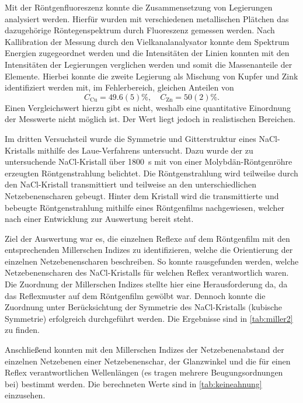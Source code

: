 Mit der Röntgenfluoreszenz konnte die Zusammensetzung von 
Legierungen analysiert werden. Hierfür wurden mit verschiedenen metallischen Plätchen 
das dazugehörige Röntegenspektrum durch Fluoreszenz gemessen werden. Nach Kallibration
der Messung durch den Vielkanalanalysator konnte dem Spektrum Energien zugegeordnet werden und die 
Intensitäten der Linien konnten mit den Intensitäten der Legierungen verglichen werden und somit
die Massenanteile der Elemente. Hierbei konnte die zweite Legierung als 
Mischung von Kupfer und Zink identifiziert werden mit, im Fehlerbereich, gleichen Anteilen von 
\begin{equation*}
    C_\mathrm{Cu} = 49.6(5)\%,\quad C_\mathrm{Zn} = 50(2)\%.
\end{equation*}
Einen Vergleichswert hierzu gibt es nicht, weshalb eine quantitative Einordnung der Messwerte 
nicht möglich ist. Der Wert liegt jedoch in realistischen Bereichen.
\\\par

Im dritten Versuchsteil wurde die Symmetrie und Gitterstruktur eines NaCl-Kristalls mithilfe des Laue-Verfahrens
untersucht. Dazu wurde der zu untersuchende NaCl-Kristall über \SI{1800}{\second} mit von einer
Molybdän-Röntgenröhre erzeugten Röntgenstrahlung belichtet. Die Röntgenstrahlung wird teilweilse durch den
NaCl-Kristall transmittiert und teilweise an den unterschiedlichen Netzebenenscharen gebeugt. Hinter dem Kristall
wird die transmittierte und bebeugte Röntgenstrahlung mithilfe eines Röntgenfilms nachgewiesen, welcher nach
einer Entwicklung zur Auswertung bereit steht.\par
Ziel der Auswertung war es, die einzelnen Reflexe auf dem Röntgenfilm mit den entsprechenden Millerschen Indizes
zu identifizieren, welche die Orientierung der einzelnen Netzebenenscharen beschreiben. So konnte rausgefunden werden,
welche Netzebenenscharen des NaCl-Kristalls für welchen Reflex verantwortlich waren. Die Zuordnung der Millerschen
Indizes stellte hier eine Herausforderung da, da das Reflexmuster auf dem Röntgenfilm gewölbt war. Dennoch konnte
die Zuordnung unter Berücksichtung der Symmetrie des NaCl-Kristalls (kubische Symmetrie) erfolgreich durchgeführt werden.
Die Ergebnisse sind in \cref{tab:miller2} zu finden.\par
Anschließend konnten mit den Millerschen Indizes der Netzebenenabstand der einzelnen Netzebenen einer Netzebenenschar,
der Glanzwinkel und die für einen Reflex verantwortlichen Wellenlängen (es tragen mehrere Beugungsordnungen bei)
bestimmt werden. Die berechneten Werte sind in \cref{tab:keineahnung} einzusehen.